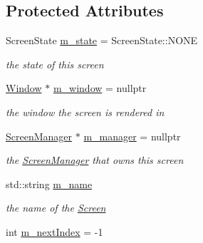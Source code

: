 \subsection*{Protected Attributes}
\begin{DoxyCompactItemize}
\item 
\mbox{\label{classnta_1_1Screen_a68d2c095aadfb248263f43cb12cd34a1}} 
Screen\+State \hyperlink{classnta_1_1Screen_a68d2c095aadfb248263f43cb12cd34a1}{m\+\_\+state} = Screen\+State\+::\+N\+O\+NE
\begin{DoxyCompactList}\small\item\em the state of this screen \end{DoxyCompactList}\item 
\mbox{\label{classnta_1_1Screen_a712bfbeb6f85d9c4229de9b974b05e58}} 
\hyperlink{classnta_1_1Window}{Window} $\ast$ \hyperlink{classnta_1_1Screen_a712bfbeb6f85d9c4229de9b974b05e58}{m\+\_\+window} = nullptr
\begin{DoxyCompactList}\small\item\em the window the screen is rendered in \end{DoxyCompactList}\item 
\mbox{\label{classnta_1_1Screen_a3496a69b02f4b120d907042d3201deff}} 
\hyperlink{classnta_1_1ScreenManager}{Screen\+Manager} $\ast$ \hyperlink{classnta_1_1Screen_a3496a69b02f4b120d907042d3201deff}{m\+\_\+manager} = nullptr
\begin{DoxyCompactList}\small\item\em the \hyperlink{classnta_1_1ScreenManager}{Screen\+Manager} that owns this screen \end{DoxyCompactList}\item 
\mbox{\label{classnta_1_1Screen_a309f2a837c5c8c42dc55206a5c63ab6a}} 
std\+::string \hyperlink{classnta_1_1Screen_a309f2a837c5c8c42dc55206a5c63ab6a}{m\+\_\+name}
\begin{DoxyCompactList}\small\item\em the name of the \hyperlink{classnta_1_1Screen}{Screen} \end{DoxyCompactList}\item 
\mbox{\label{classnta_1_1Screen_a6be3b899f3bc9e531d64676cbbd6815e}} 
int \hyperlink{classnta_1_1Screen_a6be3b899f3bc9e531d64676cbbd6815e}{m\+\_\+next\+Index} = -\/1

\end{DoxyCompactItemize}

